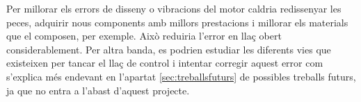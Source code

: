 \begin{itemize}
	Per millorar els errors de disseny o vibracions del motor caldria redissenyar les peces, adquirir nous components amb millors prestacions i millorar els materials que el composen, per exemple. Això reduiria l'error en llaç obert considerablement. Per altra banda, es podrien estudiar les diferents vies que existeixen per tancar el llaç de control i intentar corregir aquest error com s'explica més endevant en l'apartat \ref{sec:treballsfuturs} de possibles treballs futurs, ja que no entra a l'abast d'aquest projecte. 
	
	
	
\end{itemize}



